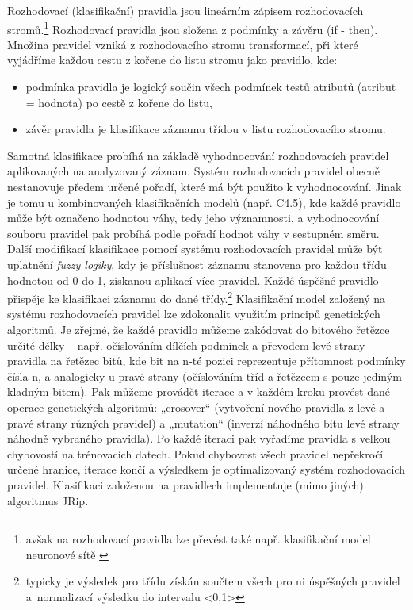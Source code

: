 \documentclass[12pt]{article}
\begin{document}
Rozhodovací (klasifikační) pravidla jsou lineárním zápisem rozhodovacích stromů.\footnote{avšak na rozhodovací pravidla lze převést také např. klasifikační model neuronové sítě \citep{han}}
Rozhodovací pravidla jsou složena z podmínky a závěru (if - then). Množina pravidel vzniká z rozhodovacího
stromu transformací, při které vyjádříme každou cestu z kořene do listu stromu jako
pravidlo, kde:
\begin{itemize}
\item podmínka pravidla je logický součin všech podmínek testů atributů (atribut = hodnota)
po cestě z kořene do listu,
\item závěr pravidla je klasifikace záznamu třídou v listu rozhodovacího stromu.
\end{itemize}
\indent
Samotná klasifikace probíhá na základě vyhodnocování rozhodovacích pravidel aplikovaných na analyzovaný záznam. Systém rozhodovacích pravidel obecně nestanovuje předem určené pořadí, které má být použito k vyhodnocování. Jinak je tomu u kombinovaných klasifikačních modelů (např. C4.5), kde každé pravidlo může být označeno hodnotou váhy, tedy jeho významnosti, a vyhodnocování souboru pravidel pak probíhá podle pořadí hodnot váhy v sestupném směru.
\newline
\indent
Další modifikací klasifikace pomocí systému rozhodovacích pravidel může být uplatnění \textit{fuzzy logiky},
kdy je příslušnost záznamu stanovena pro každou třídu hodnotou od 0 do 1, získanou aplikací
více pravidel. Každé úspěšné pravidlo přispěje ke klasifikaci záznamu do dané třídy.\footnote{typicky je výsledek pro třídu získán součtem všech pro ni úspěšných pravidel a~normalizací výsledku do intervalu <0,1>}
\newline
\indent
Klasifikační model založený na systému rozhodovacích pravidel lze zdokonalit využitím principů genetických
algoritmů. Je zřejmé, že každé pravidlo můžeme zakódovat do bitového řetězce určité délky
– např. očíslováním dílčích podmínek a převodem levé strany pravidla na řetězec bitů, kde bit
na n-té pozici reprezentuje přítomnost podmínky čísla n, a analogicky u pravé strany (očíslováním
tříd a řetězcem s pouze jediným kladným bitem). Pak můžeme provádět iterace a v každém
kroku provést dané operace genetických algoritmů: „crosover“ (vytvoření nového pravidla z levé a
pravé strany různých pravidel) a „mutation“ (inverzí náhodného bitu levé strany náhodně vybraného
pravidla). Po každé iteraci pak vyřadíme pravidla s velkou chybovostí na trénovacích datech. Pokud chybovost všech pravidel nepřekročí určené hranice, iterace končí a výsledkem je optimalizovaný systém rozhodovacích pravidel. \citep{rychly}
\newline
\indent 
Klasifikaci založenou na pravidlech implementuje (mimo jiných) algoritmus JRip.
\end{document}
